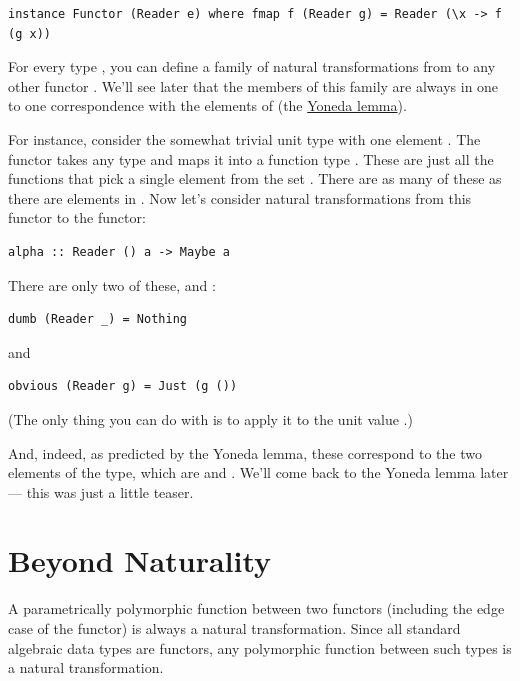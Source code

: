 \begin{verbatim}
instance Functor (Reader e) where fmap f (Reader g) = Reader (\x -> f (g x))
\end{verbatim}

For every type , you can define a family of natural
transformations from  to any other functor .
We'll see later that the members of this family are always in one to one
correspondence with the elements of  (the
\href{https://bartoszmilewski.com/2015/09/01/the-yoneda-lemma/}{Yoneda
lemma}).

For instance, consider the somewhat trivial unit type \code{()} with
one element \code{()}. The functor  takes any type
 and maps it into a function type .
These are just all the functions that pick a single element from the set
. There are as many of these as there are elements in
. Now let's consider natural transformations from this functor
to the  functor:

\begin{verbatim}
alpha :: Reader () a -> Maybe a
\end{verbatim}

There are only two of these,  and :

\begin{verbatim}
dumb (Reader _) = Nothing
\end{verbatim}

and

\begin{verbatim}
obvious (Reader g) = Just (g ())
\end{verbatim}

(The only thing you can do with  is to apply it to the unit
value \code{()}.)

And, indeed, as predicted by the Yoneda lemma, these correspond to the
two elements of the  type, which are 
and . We'll come back to the Yoneda lemma later ---
this was just a little teaser.

\section{Beyond Naturality}\label{beyond-naturality}

A parametrically polymorphic function between two functors (including
the edge case of the  functor) is always a natural
transformation. Since all standard algebraic data types are functors,
any polymorphic function between such types is a natural transformation.

